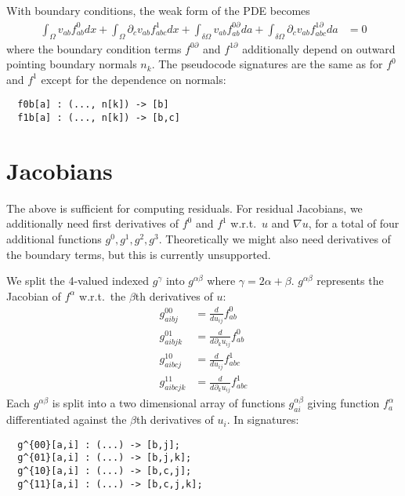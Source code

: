 \documentclass[11pt]{article}
\newcommand{\p}[1]{\partial_{#1}}
\begin{document}
With boundary conditions, the weak form of the PDE becomes
\begin{align*}
  \int_{\Omega} v_{ab} f^0_{ab} dx
    + \int_{\Omega} \p{c} v_{ab} f^1_{abc} dx
    + \int_{\delta \Omega} v_{ab} f^{0\p{}}_{ab} da
    + \int_{\delta \Omega} \p{c} v_{ab} f^{1\p{}}_{abc} da
   &= 0
\end{align*}
where the boundary condition terms $f^{0\p{}}$ and $f^{1\p{}}$ additionally depend on
outward pointing boundary normals $n_k$.  The pseudocode signatures are the same
as for $f^0$ and $f^1$ except for the dependence on normals:
\begin{verbatim}
  f0b[a] : (..., n[k]) -> [b]
  f1b[a] : (..., n[k]) -> [b,c]
\end{verbatim}

\section{Jacobians}

The above is sufficient for computing residuals.  For residual Jacobians, we additionally need
first derivatives of $f^0$ and $f^1$ w.r.t.\ $u$ and $\nabla u$, for a total of four additional
functions $g^0, g^1, g^2, g^3$.  Theoretically we might also need derivatives of the boundary
terms, but this is currently unsupported.

We split the 4-valued indexed $g^\gamma$ into $g^{\alpha\beta}$ where
$\gamma = 2\alpha+\beta$.  $g^{\alpha\beta}$ represents the Jacobian of $f^\alpha$ w.r.t.\
the $\beta$th derivatives of $u$:
\begin{align*}
  g^{00}_{aibj}  &= \frac{d}{du_{ij}} f^0_{ab} \\
  g^{01}_{aibjk} &= \frac{d}{d\p{k}u_{ij}} f^0_{ab} \\
  g^{10}_{aibcj} &= \frac{d}{du_{ij}} f^1_{abc} \\
  g^{11}_{aibcjk} &= \frac{d}{d\p{k}u_{ij}} f^1_{abc}
\end{align*}
Each $g^{\alpha\beta}$ is split into a two dimensional array of functions $g^{\alpha\beta}_{ai}$
giving function $f^\alpha_a$ differentiated against the $\beta$th derivatives of $u_i$.  In signatures:
\begin{verbatim}
  g^{00}[a,i] : (...) -> [b,j];
  g^{01}[a,i] : (...) -> [b,j,k];
  g^{10}[a,i] : (...) -> [b,c,j];
  g^{11}[a,i] : (...) -> [b,c,j,k];
\end{verbatim}
\end{document}
